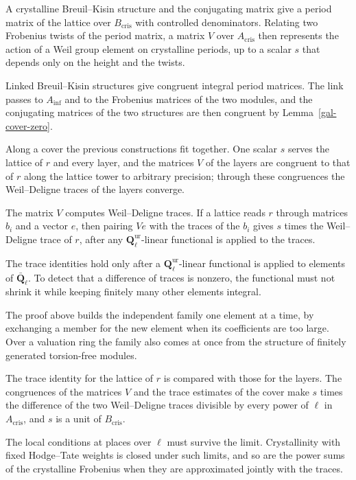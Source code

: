 A crystalline Breuil--Kisin structure and the conjugating matrix give a period matrix of the lattice
over $B_{\mathrm{cris}}$ with controlled denominators. Relating two Frobenius twists of the period
matrix, a matrix $V$ over $A_{\mathrm{cris}}$ then represents the action of a Weil group element on
crystalline periods, up to a scalar $s$ that depends only on the height and the twists.

Linked Breuil--Kisin structures give congruent integral period matrices. The link passes to $A_{\inf}$
and to the Frobenius matrices of the two modules, and the conjugating matrices of the two structures are
then congruent by Lemma~\ref{gal-cover-zero}.

Along a cover the previous constructions fit together. One scalar $s$ serves the lattice of $r$ and
every layer, and the matrices $V$ of the layers are congruent to that of $r$ along the lattice tower to
arbitrary precision; through these congruences the Weil--Deligne traces of the layers converge.

The matrix $V$ computes Weil--Deligne traces. If a lattice reads $r$ through matrices $b_i$ and a vector
$e$, then pairing $Ve$ with the traces of the $b_i$ gives $s$ times the Weil--Deligne trace of $r$, after
any $\mathbf Q_\ell^{\mathrm{ur}}$-linear functional is applied to the traces.

The trace identities hold only after a $\mathbf Q_\ell^{\mathrm{ur}}$-linear functional is applied to
elements of $\bar{\mathbf Q}_\ell$. To detect that a difference of traces is nonzero, the functional must
not shrink it while keeping finitely many other elements integral.

The proof above builds the independent family one element at a time, by exchanging a member for the new
element when its coefficients are too large. Over a valuation ring the family also comes at once from the
structure of finitely generated torsion-free modules.

The trace identity for the lattice of $r$ is compared with those for the layers. The congruences of the
matrices $V$ and the trace estimates of the cover make $s$ times the difference of the two Weil--Deligne
traces divisible by every power of $\ell$ in $A_{\mathrm{cris}}$, and $s$ is a unit of
$B_{\mathrm{cris}}$.

The local conditions at places over $\ell$ must survive the limit. Crystallinity with fixed Hodge--Tate
weights is closed under such limits, and so are the power sums of the crystalline Frobenius when they
are approximated jointly with the traces.


